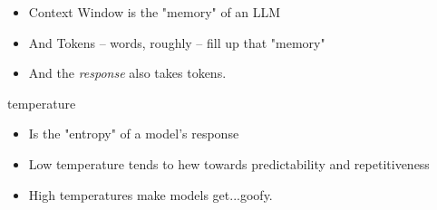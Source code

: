 \documentclass{beamer}
\begin{document}
\begin{frame}[plain]
\end{frame}

\begin{frame}
	\begin{itemize}
		\item Context Window is the "memory" of an LLM
		\pause
		\item And Tokens -- words, roughly -- fill up that "memory"
		\pause
		\item And the \textit{response} also takes tokens.
	\end{itemize}
\end{frame}


\begin{frame}[plain]
\end{frame}

\begin{frame}{temperature}
	\begin{itemize}
		\item Is the "entropy" of a model's response
		\pause
		\item Low temperature tends to hew towards predictability and repetitiveness
		\pause
		\item High temperatures make models get...goofy. 
	\end{itemize}
\end{frame}
\end{document}
